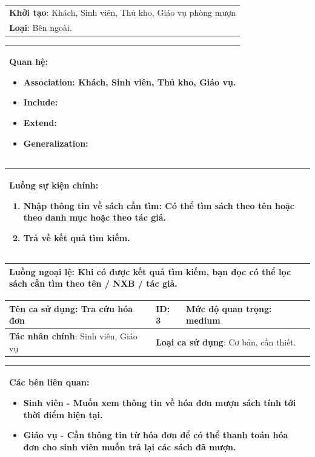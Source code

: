 \documentclass[12pt]{report}
\begin{document}
\begin{center}
\begin{tabular}{| m{15.9cm} |}
    \hline
    \textbf{Khởi tạo}: Khách, Sinh viên, Thủ kho, Giáo vụ phòng mượn \\
    \textbf{Loại}: Bên ngoài.  \\
    \hline
\end{tabular}

\begin{tabular}{| m{15.9cm} |}
    \hline
    \textbf{Quan hệ}:
    \begin{itemize}
        \item Association: Khách, Sinh viên, Thủ kho, Giáo vụ. 
        \item Include: 
        \item Extend: 
        \item Generalization: 
    \end{itemize} \\
    \hline
\end{tabular}

\begin{tabular}{| m{15.9cm} |}
    \hline
    \textbf{Luồng sự kiện chính}:
    \begin{enumerate}
        \item Nhập thông tin về sách cần tìm: Có thể tìm sách theo tên hoặc theo danh mục hoặc theo tác giả. 
        \item Trả về kết quả tìm kiếm. 
    \end{enumerate} \\
    \hline
\end{tabular}

\begin{tabular}{| m{15.9cm} |}
    \hline
    \textbf{Luồng ngoại lệ}: Khi có được kết quả tìm kiếm, bạn đọc có thể lọc sách cần tìm theo tên / NXB / tác giả. \\
    \hline
\end{tabular}

\newpage
\begin{tabular}{| m{6cm} | m{3cm} | m{6cm} |}
    \hline
    \textbf{Tên ca sử dụng}: Tra cứu hóa đơn & \textbf{ID}: 3 & \textbf{Mức độ quan trọng}: medium \\
    \hline
    \textbf{Tác nhân chính}: Sinh viên, Giáo vụ & \multicolumn{2}{|l|}{\textbf{Loại ca sử dụng}: Cơ bản, cần thiết.} \\
    \hline
\end{tabular}
\begin{tabular}{| m{15.9cm} |}
    \hline
        \textbf{Các bên liên quan:} 
        \begin{itemize}
            \item Sinh viên - Muốn xem thông tin về hóa đơn mượn sách tính tới thời điểm hiện tại. 
            \item Giáo vụ - Cần thông tin từ hóa đơn để có thể thanh toán hóa đơn cho sinh viên muốn trả lại các sách đã mượn. 
        \end{itemize} \\
    \hline
\end{tabular}


\end{center}
\end{document}
